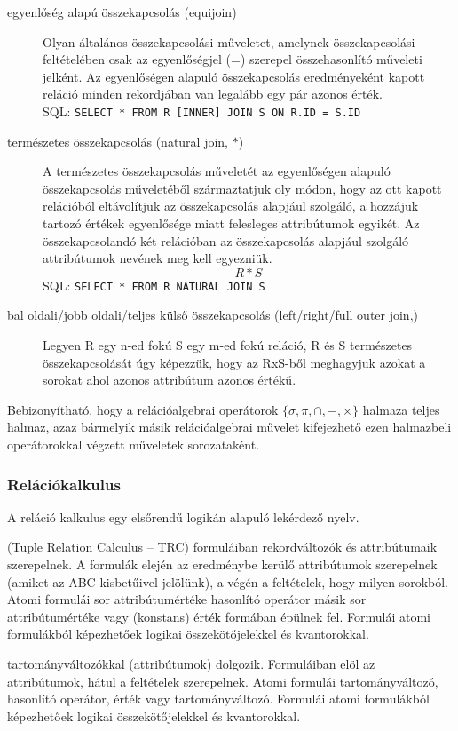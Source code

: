 \begin{description}[nosep]
\begin{description}
		\item[egyenlőség alapú összekapcsolás (equijoin)] Olyan általános összekapcsolási műveletet, amelynek összekapcsolási feltételében csak az egyenlőségjel (=) szerepel összehasonlító műveleti jelként. Az egyenlőségen alapuló összekapcsolás eredményeként kapott reláció minden rekordjában van legalább egy pár azonos érték.\\
		SQL: \verb|SELECT * FROM R [INNER] JOIN S ON R.ID = S.ID|
		
		\item[természetes összekapcsolás (natural join, $*$)] A természetes összekapcsolás műveletét az egyenlőségen alapuló összekapcsolás műveletéből származtatjuk oly módon, hogy az ott kapott relációból eltávolítjuk az összekapcsolás alapjául szolgáló, a hozzájuk tartozó értékek egyenlősége miatt felesleges attribútumok egyikét. Az összekapcsolandó két relációban az összekapcsolás alapjául szolgáló attribútumok nevének meg kell egyezniük.
		$$R*S$$
		SQL: \verb|SELECT * FROM R NATURAL JOIN S|
		
		\item[bal oldali/jobb oldali/teljes külső összekapcsolás (left/right/full outer join,)] Legyen R egy n-ed fokú S egy m-ed fokú reláció, R és S természetes összekapcsolását úgy képezzük, hogy az RxS-ből meghagyjuk azokat a sorokat ahol azonos attribútum azonos értékű.
	\end{description}
\end{description}
\begin{theorem}
	Bebizonyítható, hogy a relációalgebrai operátorok $\{ \sigma, \pi, \cap, -, \times \}$ halmaza teljes halmaz, azaz bármelyik másik relációalgebrai művelet kifejezhető ezen halmazbeli operátorokkal végzett műveletek sorozataként.
\end{theorem}

\subsubsection{Relációkalkulus}
A reláció kalkulus egy elsőrendű logikán alapuló lekérdező nyelv. 
\begin{description}[nosep]
	\item[rekord alapú (soralapú) relációkalkulus] (Tuple Relation Calculus – TRC) formuláiban rekordváltozók és attribútumaik szerepelnek. A formulák elején az eredménybe kerülő attribútumok szerepelnek (amiket az ABC kisbetűivel jelölünk), a végén a feltételek, hogy milyen sorokból. Atomi formulái sor attribútumértéke hasonlító operátor másik sor attribútumértéke vagy (konstans) érték formában épülnek fel. Formulái atomi formulákból képezhetőek logikai összekötőjelekkel és kvantorokkal.
	\item[tartomány alapú relációkalkulus] tartományváltozókkal (attribútumok) dolgozik. Formuláiban elöl az attribútumok, hátul a feltételek szerepelnek. Atomi formulái tartományváltozó, hasonlító operátor, érték vagy tartományváltozó. Formulái atomi formulákból képezhetőek logikai összekötőjelekkel és kvantorokkal.
\end{description}

